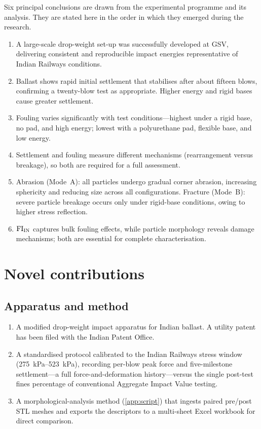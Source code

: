 Six principal conclusions are drawn from the experimental programme and its analysis. They are stated here in the order in which they emerged during the research.
\begin{enumerate}[label=\arabic*.,leftmargin=2.2em]
  \item A large-scale drop-weight set-up was successfully developed at GSV, delivering consistent and reproducible impact energies representative of Indian Railways conditions.
  \item Ballast shows rapid initial settlement that stabilises after about fifteen blows, confirming a twenty-blow test as appropriate. Higher energy and rigid bases cause greater settlement.
  \item Fouling varies significantly with test conditions---highest under a rigid base, no pad, and high energy; lowest with a polyurethane pad, flexible base, and low energy.
  \item Settlement and fouling measure different mechanisms (rearrangement versus breakage), so both are required for a full assessment.
  \item Abrasion (Mode~A): all particles undergo gradual corner abrasion, increasing sphericity and reducing size across all configurations. Fracture (Mode~B): severe particle breakage occurs only under rigid-base conditions, owing to higher stress reflection.
  \item $\mathrm{FI}_{\mathrm{IN}}$ captures bulk fouling effects, while particle morphology reveals damage mechanisms; both are essential for complete characterisation.
\end{enumerate}

\section{Novel contributions}
\label{sec:contributions}

\subsection{Apparatus and method}
\label{sec:contrib-apparatus}

\begin{enumerate}[label=(\alph*),leftmargin=2.2em]
  \item A modified drop-weight impact apparatus for Indian ballast. A utility patent has been filed with the Indian Patent Office.
  \item A standardised protocol calibrated to the Indian Railways stress window (\qtyrange{275}{523}{\kPa}), recording per-blow peak force and five-milestone settlement---a full force-and-deformation history---versus the single post-test fines percentage of conventional Aggregate Impact Value testing.
  \item A morphological-analysis method (\cref{app:script}) that ingests paired pre/post STL meshes and exports the descriptors to a multi-sheet Excel workbook for direct comparison.
\end{enumerate}

